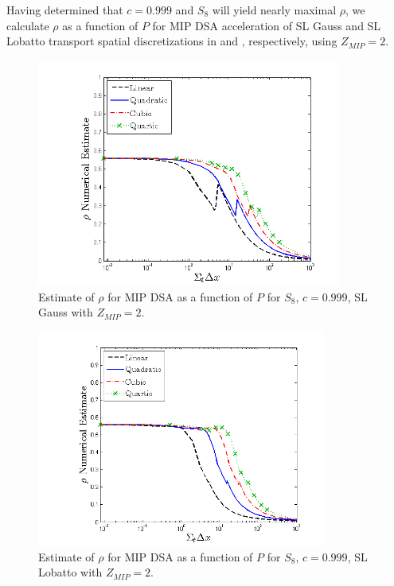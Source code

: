 

Having determined that $c=0.999$ and $S_8$ will yield nearly maximal $\rho$, we calculate $\rho$ as a function of $P$ for MIP DSA acceleration of SL Gauss and SL Lobatto transport spatial discretizations in  and , respectively, using $Z_{MIP}=2$.  
\begin{figure}[!hbp]
\centering
\includegraphics[width=10cm]{chapter4_acceleration/Const_2_Constant_XS_SN8_MIP_Gauss.png}
\caption{Estimate of $\rho$ for MIP DSA as a function of $P$ for  $S_8$, $c=0.999$, SL Gauss with $Z_{MIP}=2$.}
\label{fig:mip_gauss}
\end{figure}

%
\begin{figure}[!htp]
\centering
\includegraphics[width=9.5cm]{chapter4_acceleration/Const_2_Constant_XS_SN8_MIP_Lobatto.png}
\caption{Estimate of $\rho$ for MIP DSA as a function of $P$ for $S_8$, $c=0.999$,  SL Lobatto with $Z_{MIP}=2$.}
\label{fig:mip_lobatto}
\end{figure}

